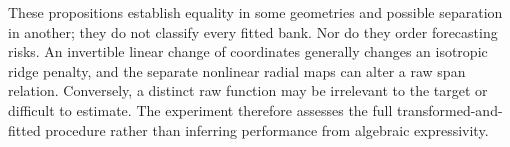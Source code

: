 These propositions establish equality in some geometries and possible separation in another; they do not classify every fitted bank. Nor do they order forecasting risks. An invertible linear change of coordinates generally changes an isotropic ridge penalty, and the separate nonlinear radial maps can alter a raw span relation. Conversely, a distinct raw function may be irrelevant to the target or difficult to estimate. The experiment therefore assesses the full transformed-and-fitted procedure rather than inferring performance from algebraic expressivity.
